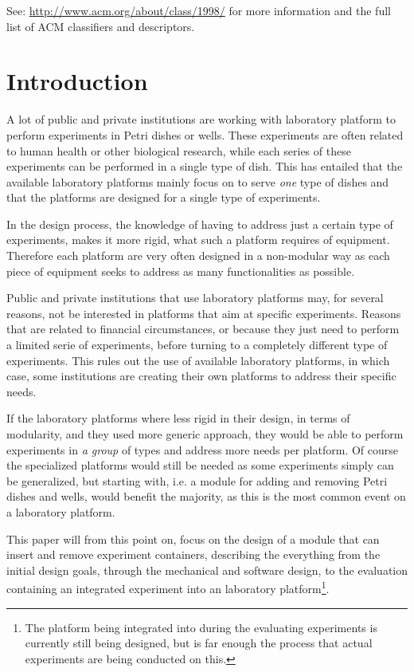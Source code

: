 \documentclass{sigchi}
\begin{document}
	See: \url{http://www.acm.org/about/class/1998/}
	for more information and the full list of ACM classifiers
	and descriptors. \newline
	
	\section{Introduction}
	A lot of public and private institutions are working with laboratory platform to perform experiments in Petri dishes or wells. These experiments are often related to human health or other biological research, while each series of these experiments can be performed in a single type of dish. This has entailed that the available laboratory platforms mainly focus on to serve \textit{one} type of dishes and that the platforms are designed for a single type of experiments. 
	
	In the design process, the knowledge of having to address just a certain type of experiments, makes it more rigid, what such a platform requires of equipment. Therefore each platform are very often designed in a non-modular way as each piece of equipment seeks to address as many functionalities as possible.
	
	Public and private institutions that use laboratory platforms may, for several reasons, not be interested in platforms that aim at specific experiments. Reasons that are related to financial circumstances, or because they just need to perform a limited serie of experiments, before turning to a completely different type of experiments. This rules out the use of available laboratory platforms, in which case, some institutions are creating their own platforms to address their specific needs.
	
	If the laboratory platforms where less rigid in their design, in terms of modularity, and they used more generic approach, they would be able to perform experiments in \textit{a group} of types and address more needs per platform. Of course the specialized platforms would still be needed as some experiments simply can be generalized, but starting with, i.e. a module for adding and removing Petri dishes and wells, would benefit the majority, as this is the most common event on a laboratory platform.
	
	This paper will from this point on, focus on the design of a module that can insert and remove experiment containers, describing the everything from the initial design goals, through  the mechanical and software design, to the evaluation containing an integrated experiment into an laboratory platform\footnote{The platform being integrated into during the evaluating experiments is currently still being designed, but is far enough the process that actual experiments are being conducted on this.}.
	
\end{document}
